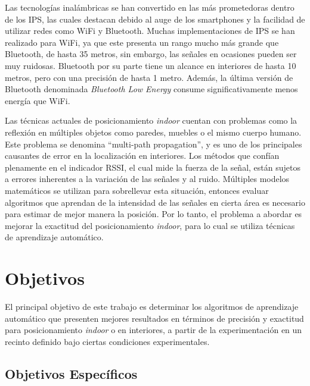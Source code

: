 Las tecnologías inalámbricas se han convertido en las más prometedoras dentro de los IPS, las cuales destacan debido al auge de los smartphones y la facilidad de utilizar redes como WiFi y Bluetooth. Muchas implementaciones de IPS se han realizado para WiFi, ya que este presenta un rango mucho más grande que Bluetooth, de hasta 35 metros, sin embargo, las señales en ocasiones pueden ser muy ruidosas. Bluetooth por su parte tiene un alcance en interiores de hasta 10 metros, pero con una precisión de hasta 1 metro.  Además, la última versión de Bluetooth denominada \textit{Bluetooth Low Energy} consume significativamente menos energía que WiFi.

Las técnicas actuales de posicionamiento \textit{indoor} cuentan con problemas como la reflexión en múltiples objetos como paredes, muebles o el mismo cuerpo humano. Este problema se denomina  “multi-path propagation”, y es uno de los principales causantes de error en la localización en interiores. Los métodos que confían plenamente en el indicador RSSI, el cual mide la fuerza de la señal, están sujetos a errores inherentes a la variación de las señales y al ruido.  Múltiples modelos matemáticos se utilizan para sobrellevar esta situación, entonces evaluar algoritmos que aprendan de la intensidad de las señales en cierta área es necesario para estimar de mejor manera la posición. Por lo tanto, el problema a abordar es mejorar la exactitud del posicionamiento \textit{indoor}, para lo cual se utiliza técnicas de aprendizaje automático.

\section{Objetivos}

El principal objetivo de este trabajo es determinar los algoritmos de aprendizaje automático que presenten mejores resultados en términos de precisión y exactitud para posicionamiento \textit{indoor} o en interiores, a partir de la experimentación en un recinto definido bajo ciertas condiciones experimentales.

\subsection{Objetivos Específicos}

